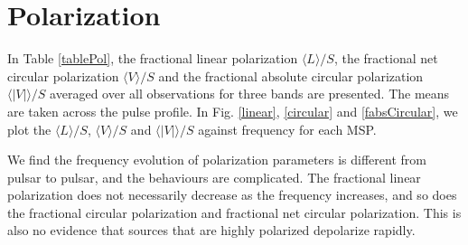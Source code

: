 \documentclass[useAMS,usenatbib]{mn2e}
\begin{document}
\section{Polarization}

In Table \ref{tablePol}, the fractional linear polarization $\langle L \rangle/S$, 
the fractional net circular polarization $\langle V \rangle/S$ and the fractional absolute 
circular polarization $\langle|V|\rangle/S$ averaged over all observations for 
three bands are presented. 
%
The means are taken across the pulse profile.
%
In Fig. \ref{linear}, \ref{circular} and \ref{fabsCircular}, we plot the $\langle L \rangle/S$, 
$\langle V \rangle/S$ and $\langle|V|\rangle/S$ against frequency for each MSP.
%

We find the frequency evolution of polarization parameters is different from pulsar 
to pulsar, and the behaviours are complicated. 
%
The fractional linear polarization does not necessarily decrease as the frequency 
increases, and so does the fractional circular polarization and fractional net circular 
polarization. 
%
This is also no evidence that sources that are highly polarized depolarize rapidly.
%
\end{document}
